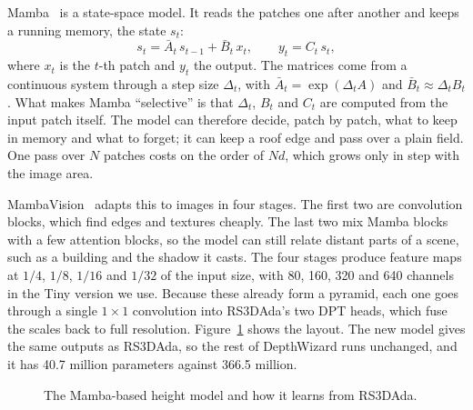 \documentclass[11pt,a4paper]{article}
\begin{document}
Mamba~\cite{gu2023mamba} is a state-space model. It reads the patches one after another and keeps a running memory, the state $s_t$:
\begin{equation}
s_t = \bar A_t\, s_{t-1} + \bar B_t\, x_t, \qquad y_t = C_t\, s_t ,
\label{eq:ssm}
\end{equation}
where $x_t$ is the $t$-th patch and $y_t$ the output. The matrices come from a continuous system through a step size $\Delta_t$, with $\bar A_t = \exp(\Delta_t A)$ and $\bar B_t \approx \Delta_t B_t$. What makes Mamba ``selective'' is that $\Delta_t$, $B_t$ and $C_t$ are computed from the input patch itself. The model can therefore decide, patch by patch, what to keep in memory and what to forget; it can keep a roof edge and pass over a plain field. One pass over $N$ patches costs on the order of $N d$, which grows only in step with the image area.

MambaVision~\cite{hatamizadeh2025mambavision} adapts this to images in four stages. The first two are convolution blocks, which find edges and textures cheaply. The last two mix Mamba blocks with a few attention blocks, so the model can still relate distant parts of a scene, such as a building and the shadow it casts. The four stages produce feature maps at $1/4$, $1/8$, $1/16$ and $1/32$ of the input size, with 80, 160, 320 and 640 channels in the Tiny version we use. Because these already form a pyramid, each one goes through a single $1\times1$ convolution into RS3DAda's two DPT heads, which fuse the scales back to full resolution. Figure~\ref{fig:arch} shows the layout. The new model gives the same outputs as RS3DAda, so the rest of DepthWizard runs unchanged, and it has 40.7 million parameters against 366.5 million.

\begin{figure}[!htbp]
\centering
{}
\caption{The Mamba-based height model and how it learns from RS3DAda.}
\label{fig:arch}
\end{figure}
\end{document}
